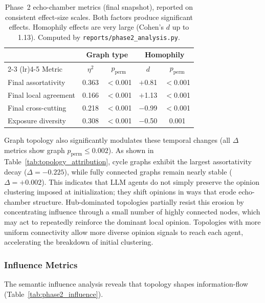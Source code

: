 \documentclass[11pt]{article}
\begin{document}
\begin{table}[t]
\centering
\begin{tabular}{l cc cc}
\toprule
& \multicolumn{2}{c}{Graph type} & \multicolumn{2}{c}{Homophily} \\
\cmidrule(lr){2-3} \cmidrule(lr){4-5}
Metric & $\eta^2$ & $p_{\text{perm}}$ & $d$ & $p_{\text{perm}}$ \\
\midrule
Final assortativity   & 0.363 & $<$0.001 & $+$0.81 & $<$0.001 \\
Final local agreement & 0.166 & $<$0.001 & $+$1.13 & $<$0.001 \\
Final cross-cutting   & 0.218 & $<$0.001 & $-$0.99 & $<$0.001 \\
Exposure diversity    & 0.308 & $<$0.001 & $-$0.50 & 0.001 \\
\bottomrule
\end{tabular}
\caption{Phase~2 echo-chamber metrics (final snapshot), reported on consistent effect-size scales. Both factors produce significant effects. Homophily effects are very large (Cohen's $d$ up to 1.13). Computed by \texttt{reports/phase2\_analysis.py}.}
\label{tab:phase2_echo}
\end{table}

Graph topology also significantly modulates these temporal changes (all $\Delta$ metrics show graph $p_{\text{perm}} \leq 0.002$). As shown in Table~\ref{tab:topology_attribution}, cycle graphs exhibit the largest assortativity decay ($\Delta = -0.225$), while fully connected graphs remain nearly stable ($\Delta = +0.002$). This indicates that LLM agents do not simply preserve the opinion clustering imposed at initialization; they shift opinions in ways that erode echo-chamber structure. Hub-dominated topologies partially resist this erosion by concentrating influence through a small number of highly connected nodes, which may act to repeatedly reinforce the dominant local opinion. Topologies with more uniform connectivity allow more diverse opinion signals to reach each agent, accelerating the breakdown of initial clustering.

\subsubsection{Influence Metrics}
\label{sec:phase2_influence}

The semantic influence analysis reveals that topology shapes information-flow (Table~\ref{tab:phase2_influence}).
\end{document}
